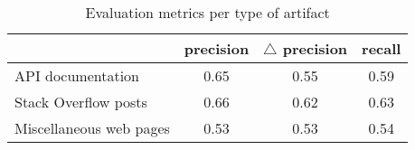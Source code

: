 \begin{table}
\caption{Evaluation metrics per type of artifact}
\label{tbl:comparison-artifact-type-wise}
\centering    
\begin{threeparttable}
\begin{tabular}{lccc}




& \textbf{precision} & $\triangle$ \textbf{precision} & \textbf{recall} \\ 
\hline

API documentation & 0.65 & 0.55 & 0.59
\\

Stack Overflow posts  & 0.66 & 0.62 & 0.63
\\

Miscellaneous web pages & 0.53 & 0.53 & 0.54
\\


\hline
\end{tabular}
\end{threeparttable}
\end{table}





